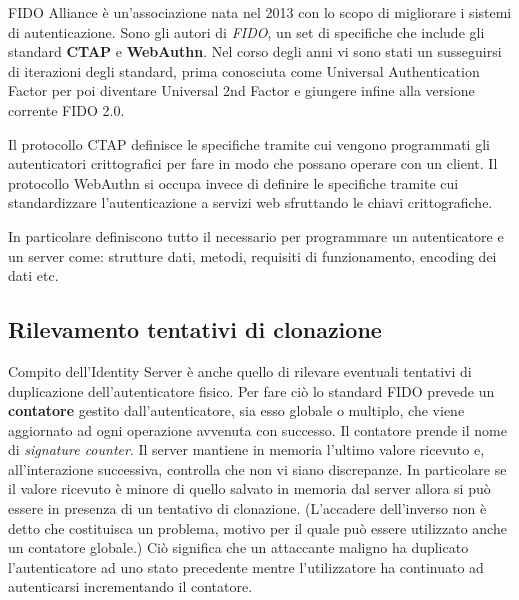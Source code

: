 FIDO Alliance è un'associazione nata nel 2013 con lo scopo di migliorare i sistemi di autenticazione. Sono gli autori di \emph{FIDO}, un set di specifiche che include gli standard \textbf{CTAP} e \textbf{WebAuthn}. Nel corso degli anni vi sono stati un susseguirsi di iterazioni degli standard, prima conosciuta come Universal Authentication Factor per poi diventare Universal 2nd Factor e giungere infine alla versione corrente FIDO 2.0. 

Il protocollo CTAP definisce le specifiche tramite cui vengono programmati gli autenticatori crittografici per fare in modo che possano operare con un client. Il protocollo WebAuthn si occupa invece di definire le specifiche tramite cui standardizzare l'autenticazione a servizi web sfruttando le chiavi crittografiche. 

In particolare definiscono tutto il necessario per programmare un autenticatore e un server come: strutture dati, metodi, requisiti di funzionamento, encoding dei dati etc.

\subsection{Rilevamento tentativi di clonazione}
\label{fido:clonazione}

Compito dell'Identity Server è anche quello di rilevare eventuali tentativi di duplicazione dell'autenticatore fisico. Per fare ciò lo standard FIDO prevede un \textbf{contatore} gestito dall'autenticatore, sia esso globale o multiplo, che viene aggiornato ad ogni operazione avvenuta con successo. Il contatore prende il nome di \emph{signature counter}. Il server mantiene in memoria l'ultimo valore ricevuto e, all'interazione successiva, controlla che non vi siano discrepanze. In particolare se il valore ricevuto è minore di quello salvato in memoria dal server allora si può essere in presenza di un tentativo di clonazione. (L'accadere dell'inverso non è detto che costituisca un problema, motivo per il quale può essere utilizzato anche un contatore globale.) Ciò significa che un attaccante maligno ha duplicato l'autenticatore ad uno stato precedente mentre l'utilizzatore ha continuato ad autenticarsi incrementando il contatore. 